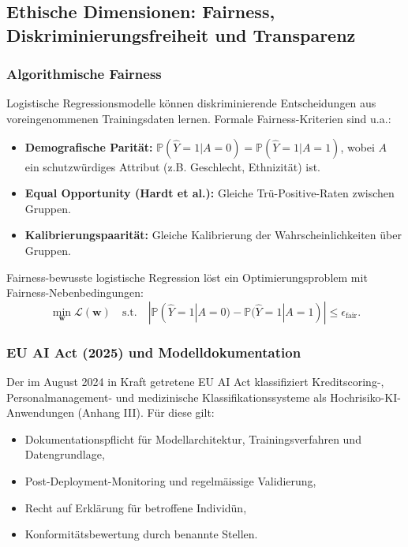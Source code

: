 ﻿\documentclass[12pt, a4paper]{article}
\theoremstyle{definition}
\theoremstyle{remark}
\newcommand{\Prob}{\mathbb{P}}
\newcommand{\vw}{\bm{w}}
\begin{document}
\subsection{Ethische Dimensionen: Fairness, Diskriminierungsfreiheit und Transparenz}

\subsubsection{Algorithmische Fairness}

Logistische Regressionsmodelle können diskriminierende Entscheidungen aus voreingenommenen
Trainingsdaten lernen. Formale Fairness-Kriterien sind u.a.:

\begin{itemize}
  \item \textbf{Demografische Parität:} $\Prob(\hat{Y}=1|A=0) = \Prob(\hat{Y}=1|A=1)$, wobei $A$ ein schutzwürdiges Attribut (z.B. Geschlecht, Ethnizität) ist.
  \item \textbf{Equal Opportunity (Hardt et al.):} Gleiche Trü-Positive-Raten zwischen Gruppen.
  \item \textbf{Kalibrierungspaarität:} Gleiche Kalibrierung der Wahrscheinlichkeiten über Gruppen.
\end{itemize}

Fairness-bewusste logistische Regression löst ein Optimierungsproblem mit Fairness-Nebenbedingungen:
\begin{equation}
  \min_{\vw} \mathcal{L}(\vw) \quad \text{s.t.} \quad |\Prob(\hat{Y}=1|A=0) - \Prob(\hat{Y}=1|A=1)| \leq \epsilon_{\mathrm{fair}}.
\end{equation}

\subsubsection{EU AI Act (2025) und Modelldokumentation}

Der im August 2024 in Kraft getretene EU AI Act klassifiziert Kreditscoring-, Personal\-management-
und medizinische Klassifikationssysteme als Hochrisiko-KI-Anwendungen (Anhang III). Für diese
gilt:
\begin{itemize}
  \item Dokumentationspflicht für Modellarchitektur, Trainingsverfahren und Datengrundlage,
  \item Post-Deployment-Monitoring und regelmäissige Validierung,
  \item Recht auf Erklärung für betroffene Individün,
  \item Konformitätsbewertung durch benannte Stellen.
\end{itemize}
\end{document}
